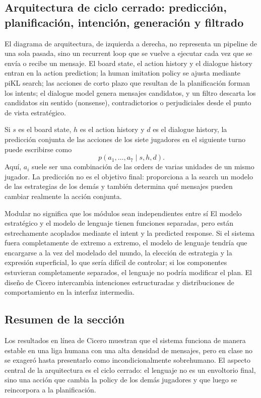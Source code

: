 \subsection{Arquitectura de ciclo cerrado: predicción, planificación, intención, generación y filtrado}

El diagrama de arquitectura, de izquierda a derecha, no representa un pipeline de una sola pasada, sino un recurrent loop que se vuelve a ejecutar cada vez que se envía o recibe un mensaje. El board state, el action history y el dialogue history entran en la action prediction; la human imitation policy se ajusta mediante piKL search; las acciones de corto plazo que resultan de la planificación forman los intents; el dialogue model genera mensajes candidatos, y un filtro descarta los candidatos sin sentido (nonsense), contradictorios o perjudiciales desde el punto de vista estratégico.


Si $s$ es el board state, $h$ es el action history y $d$ es el dialogue history, la predicción conjunta de las acciones de los siete jugadores en el siguiente turno puede escribirse como
\begin{equation}
p(a_1,\ldots,a_7\mid s,h,d).
\end{equation}
Aquí, $a_i$ suele ser una combinación de las orders de varias unidades de un mismo jugador. La predicción no es el objetivo final: proporciona a la search un modelo de las estrategias de los demás y también determina qué mensajes pueden cambiar realmente la acción conjunta.

\begin{importantbox}{Modular no significa que los módulos sean independientes entre sí}
El modelo estratégico y el modelo de lenguaje tienen funciones separadas, pero están estrechamente acoplados mediante el intent y la predicted response. Si el sistema fuera completamente de extremo a extremo, el modelo de lenguaje tendría que encargarse a la vez del modelado del mundo, la elección de estrategia y la expresión superficial, lo que sería difícil de controlar; si los componentes estuvieran completamente separados, el lenguaje no podría modificar el plan. El diseño de Cicero intercambia intenciones estructuradas y distribuciones de comportamiento en la interfaz intermedia.
\end{importantbox}

\subsection{Resumen de la sección}

Los resultados en línea de Cicero muestran que el sistema funciona de manera estable en una liga humana con una alta densidad de mensajes, pero en clase no se exageró hasta presentarlo como incondicionalmente sobrehumano. El aspecto central de la arquitectura es el ciclo cerrado: el lenguaje no es un envoltorio final, sino una acción que cambia la policy de los demás jugadores y que luego se reincorpora a la planificación.
